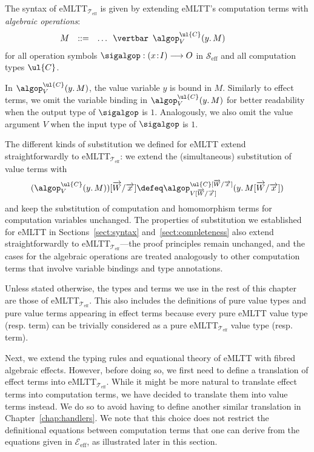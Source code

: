 \begin{definition}
\label{def:extensionofeMLTTsyntaxwithfibalgeffects}
The syntax of eMLTT$_{\mathcal{T}_{\text{eff}}}$ is given by extending eMLTT's computation terms with \emph{algebraic operations}:
\[
\begin{array}{r c l @{\qquad\qquad}l}
M & ::= & \ldots \,\,\,\vertbar\,\,\, \algop^{\ul{C}}_V(y .\, M)
\end{array}
\]
for all operation symbols $\sigalgop : (x \!:\! I) \longrightarrow O$ in $\mathcal{S}_{\text{eff}}$ and all  computation types $\ul{C}$.
\end{definition}

In $\algop^{\ul{C}}_V(y .\, M)$, the value variable $y$ is bound in $M$.
Similarly to effect terms, we omit the variable binding in $\algop^{\ul{C}}_V(y .\, M)$ for better readability when the output type of $\sigalgop$ is $1$. Analogously, 
we also omit the value argument $V$ when the input type of $\sigalgop$ is $1$. 

The different kinds of substitution we defined for eMLTT extend straightforwardly to eMLTT$_{\mathcal{T}_{\text{eff}}}$: we extend the (simultaneous) substitution of value terms with
\[
(\algop^{\ul{C}}_V(y .\, M))[\overrightarrow{W}/\overrightarrow{x}] \defeq \algop^{\ul{C}[\overrightarrow{W}/\overrightarrow{x}]}_{V[\overrightarrow{W}/\overrightarrow{x}]}(y .\, M[\overrightarrow{W}/\overrightarrow{x}])
\]
and keep the substitution of computation and homomorphism terms for computation variables unchanged. 
The properties of substitution we established for eMLTT in Sections~\ref{sect:syntax} and~\ref{sect:completeness} also extend straightforwardly to eMLTT$_{\mathcal{T}_{\text{eff}}}$---the  proof principles remain unchanged, and the cases for the algebraic operations are treated analogously to other computation terms that involve variable bindings and type annotations.

Unless stated otherwise, the types and terms we use in the rest of this chapter are those of eMLTT$_{\mathcal{T}_{\text{eff}}}$.
This also includes the definitions of pure value types and pure value terms appearing in effect terms because every pure eMLTT value type (resp. term) can be trivially considered as a pure eMLTT$_{\mathcal{T}_{\text{eff}}}$ value type (resp. term).

Next, we extend the typing rules and equational theory of eMLTT with fibred algebraic effects. However, 
before doing so, we first need to define a translation of effect terms into eMLTT$_{\mathcal{T}_{\text{eff}}}$. While it might be more natural to translate effect terms into computation terms, we have decided to translate them into value terms instead. We do so to avoid having to define another similar translation in Chapter~\ref{chap:handlers}. We note that this choice does not restrict the definitional equations between computation terms that one can derive from the equations given in $\mathcal{E}_{\text{eff}}$, as illustrated later in this section.

